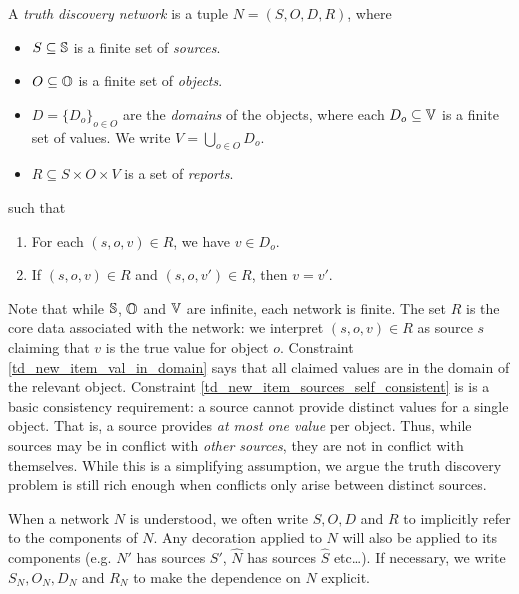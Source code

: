 \begin{definition}
    \label{td_new_def_network}
    A \emph{truth discovery network} is a tuple $N = (S, O, D, R)$, where
    \begin{itemize}
        \item $S \subseteq \S$ is a finite set of \emph{sources}.
        \item $O \subseteq \O$ is a finite set of \emph{objects}.
        \item $D = \{D_o\}_{o \in O}$ are the \emph{domains} of the objects,
              where each $D_o \subseteq \V$ is a finite set of values. We write
              $V = \bigcup_{o \in O}{D_o}$.
        \item $R \subseteq S \times O \times V$ is a set of \emph{reports}.
    \end{itemize}
    such that
    \begin{enumerate}
        \item\label{td_new_item_val_in_domain}
            For each $(s, o, v) \in R$, we have $v \in D_o$.
        \item\label{td_new_item_sources_self_consistent}
            If $(s, o, v) \in R$ and $(s, o, v') \in R$, then $v = v'$.
    \end{enumerate}
\end{definition}

Note that while $\S$, $\O$ and $\V$ are infinite, each network is finite. The
set $R$ is the core data associated with the network: we interpret $(s, o, v)
\in R$ as source $s$ claiming that $v$ is the true value for object $o$.
Constraint \cref{td_new_item_val_in_domain} says that all claimed values are in
the domain of the relevant object. Constraint
\cref{td_new_item_sources_self_consistent} is is a basic consistency
requirement: a source cannot provide distinct values for a single object. That
is, a source provides \emph{at most one value} per object.  Thus, while sources
may be in conflict with \emph{other sources}, they are not in conflict with
themselves.  While this is a simplifying assumption, we argue the truth
discovery problem is still rich enough when conflicts only arise between
distinct sources.

When a network $N$ is understood, we often write $S, O, D$ and $R$ to
implicitly refer to the components of $N$. Any decoration applied to $N$ will
also be applied to its components (e.g. $N'$ has sources $S'$, $\hat{N}$ has
sources $\hat{S}$ etc\ldots). If necessary, we write $S_N, O_N, D_N$ and $R_N$
to make the dependence on $N$ explicit.

